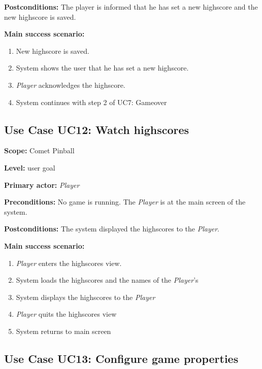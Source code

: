 \documentclass[fontsize=12pt,
               paper=a4,
               twoside=false,
               parskip=half,
               ]{scrartcl}
\begin{document}
\textbf{\textsf{Postconditions:}} The player is informed that he has set a new highscore and the new highscore is saved.

\textbf{\textsf{Main success scenario:}}

\begin{enumerate}[leftmargin=3em]
	\item New highscore is saved.
	\item System shows the user that he has set a new highscore.
	\item \emph{Player} acknowledges the highscore.
	\item System continues with step 2 of UC7: Gameover
\end{enumerate}




\subsection{Use Case UC12: Watch highscores }

\textbf{\textsf{Scope:}} Comet Pinball

\textbf{\textsf{Level:}} user goal

\textbf{\textsf{Primary actor:}} \emph{Player}

\textbf{\textsf{Preconditions:}} No game is running. The \emph{Player} is at the main screen of the system.

\textbf{\textsf{Postconditions:}} The system displayed the highscores to the \emph{Player}.

\textbf{\textsf{Main success scenario:}}

\begin{enumerate}[leftmargin=3em]
	\item \emph{Player} enters the highscores view.
	\item System loads the highscores and the names of the \emph{Player}'s
	\item System displays the highscores to the \emph{Player}
	\item \emph{Player} quits the highscores view
	\item System returns to main screen	
\end{enumerate}




\subsection{Use Case UC13: Configure game properties }
\end{document}
